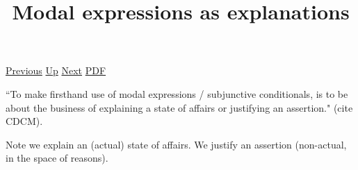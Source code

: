 \documentclass[12pt,a4paper]{report}
\begin{document}
 \href{doc/phil/People/Sellars/Quotes/Manasrationalanimal.html}{Previous} 
 \href{doc/phil/People/Sellars/Quotes.html}{Up} 
 \href{doc/phil/People/Sellars/Quotes/Modalitiesandnorms.html}{Next} 
 \href{doc/phil/People/Sellars/Quotes/Modalexpressionsasexplanations.pdf}{PDF} 
\title{Modal expressions as explanations}
``To make firsthand use of modal expressions / subjunctive conditionals, is to
be about the business of explaining a state of affairs or justifying an
assertion." (cite CDCM).

Note we explain an (actual) state of affairs. We justify an assertion
(non-actual, in the space of reasons).
\end{document}

